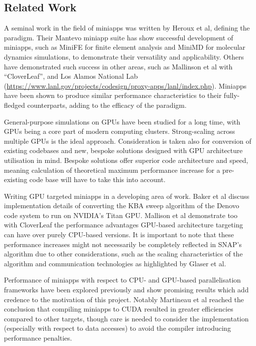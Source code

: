 \documentclass[conference]{IEEEtran}
\begin{document}

\subsection{Related Work}

A seminal work in the field of miniapps was written by Heroux et al\cite{miniapps}, defining the paradigm. Their Mantevo miniapp suite has show successful development of miniapps, such as MiniFE for finite element analysis and MiniMD for molecular dynamics simulations, to demonstrate their versatility and applicability. Others have demonstrated such success in other areas, such as Mallinson et al with ``CloverLeaf”\cite{mallinson2013cloverleaf}, and Los Alamos National Lab (\url{https://www.lanl.gov/projects/codesign/proxy-apps/lanl/index.php}). Miniapps have been shown to produce similar performance characteristics to their fully-fledged counterparts\cite{miniapps}, adding to the efficacy of the paradigm.

General-purpose simulations on GPUs have been studied for a long time, with GPUs being a core part of modern computing clusters\cite{debardeleben2013gpu}. Strong-scaling across multiple GPUs\cite{glaser2015strong} is the ideal approach. Consideration is taken also for conversion of existing codebases\cite{zhou2011gpu} and new, bespoke solutions designed with GPU architecture utilisation in mind\cite{glaser2015strong}. Bespoke solutions offer superior code architecture and speed, meaning calculation of theoretical maximum performance increase for a pre-existing code base will have to take this into account.

Writing GPU targeted miniapps in a developing area of work. Baker et al\cite{baker2012high} discuss implementation details of converting the KBA sweep algorithm of the Denovo code system to run on NVIDIA’s Titan GPU. Mallison et al\cite{mallinson2013cloverleaf} demonstrate too with CloverLeaf the performance advantages GPU-based architecture targeting can have over purely CPU-based versions. It is important to note that these performance increases might not necessarily be completely reflected in SNAP’s algorithm due to other considerations, such as the scaling characteristics of the algorithm\cite{shoukourian2014predicting} and communication technologies as highlighted by Glaser et al\cite{glaser2015strong}.

Performance of miniapps with respect to CPU- and GPU-based parallelisation frameworks have been explored previously and show promising results which add credence to the motivation of this project. Notably Martineau et al\cite{martineau2017productivity} reached the conclusion that compiling miniapps to CUDA resulted in greater efficiencies compared to other targets, though care is needed to consider the implementation (especially with respect to data accesses) to avoid the compiler introducing performance penalties.
\end{document}
